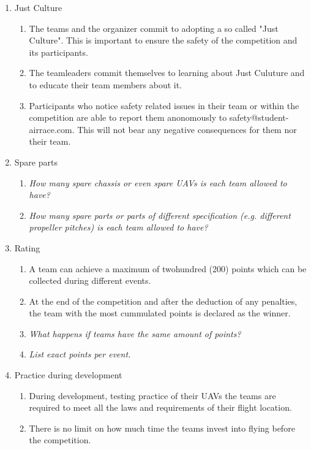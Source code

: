 \begin{enumerate}
    \item{Just Culture}
    \begin{enumerate}
      \item The teams and the organizer commit to adopting a so called "Just Culture". This is important to ensure the safety of the competition and its participants.
      \item The teamleaders commit themselves to learning about Just Culuture and to educate their team members about it.
      \item Participants who notice safety related issues in their team or within the competition are able to report them anonomously to safety@student-airrace.com. This will not bear any
      negative consequences for them nor their team. 
    \end{enumerate}

    \item{Spare parts}
    \begin{enumerate}
      \item \emph{How many spare chassis or even spare UAVs is each team allowed to have?}
      \item \emph{How many spare parts or parts of different specification (e.g. different propeller pitches) is each team allowed to have?}
    \end{enumerate}

    \item{Rating}
    \begin{enumerate}
      \item A team can achieve a maximum of twohundred (200) points which can be collected during different events.
      \item At the end of the competition and after the deduction of any penalties, the team with the most cummulated points is declared as the winner. 
      \item \emph{What happens if teams have the same amount of points?}
      \item \emph{List exact points per event.}
    \end{enumerate}

    \item{Practice during development}
    \begin{enumerate}
      \item During development, testing practice of their UAVs the teams are required to meet all the laws and requirements of their flight location. 
      \item There is no limit on how much time the teams invest into flying before the competition. 
    \end{enumerate}


\end{enumerate}
